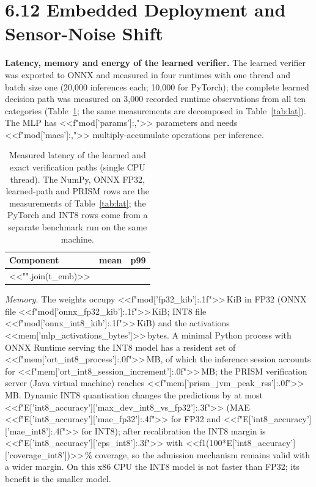 \documentclass[11pt]{article}
\begin{document}
\section*{6.12 \quad Embedded Deployment and Sensor-Noise Shift}
\textbf{Latency, memory and energy of the learned verifier.} The learned verifier was exported to ONNX and measured in four runtimes with one
thread and batch size one (20,000 inferences each; 10,000 for PyTorch); the complete learned decision path was measured on 3,000 recorded runtime observations
from all ten categories (Table~\ref{tab:emb}; the same measurements are decomposed in Table~\ref{tab:lat}). The MLP has <<f"{mod['params']:,}">> parameters and needs <<f"{mod['macs']:,}">> multiply-accumulate operations per
inference.

\begin{table}[h]
\centering\small
\caption{Measured latency of the learned and exact verification paths (single CPU thread). The NumPy, ONNX FP32, learned-path and PRISM rows are the
measurements of Table~\ref{tab:lat}; the PyTorch and INT8 rows come from a separate benchmark run on the same machine.}\label{tab:emb}
\begin{tabular}{lcc}
\toprule
Component & mean & p99 \\
\midrule
<<"\n".join(t_emb)>>
\bottomrule
\end{tabular}
\end{table}

\emph{Memory.} The weights occupy <<f"{mod['fp32_kib']:.1f}">>\,KiB in FP32 (ONNX file <<f"{mod['onnx_fp32_kib']:.1f}">>\,KiB; INT8 file
<<f"{mod['onnx_int8_kib']:.1f}">>\,KiB) and the activations <<mem['mlp_activations_bytes']>>\,bytes. A minimal Python process with ONNX Runtime serving
the INT8 model has a resident set of <<f"{mem['ort_int8_process']:.0f}">>\,MB, of which the inference session accounts for
<<f"{mem['ort_int8_session_increment']:.0f}">>\,MB; the PRISM verification server (Java virtual machine) reaches <<f"{mem['prism_jvm_peak_rss']:.0f}">>\,MB.
Dynamic INT8 quantisation changes the predictions by at most <<f"{E['int8_accuracy']['max_dev_int8_vs_fp32']:.3f}">> (MAE
<<f"{E['int8_accuracy']['mae_fp32']:.4f}">> for FP32 and <<f"{E['int8_accuracy']['mae_int8']:.4f}">> for INT8); after recalibration the INT8 margin is
<<f"{E['int8_accuracy']['eps_int8']:.3f}">> with <<f1(100*E['int8_accuracy']['coverage_int8'])>>\,\% coverage, so the admission mechanism remains valid with a
wider margin. On this x86 CPU the INT8 model is not faster than FP32; its benefit is the smaller model.
\end{document}
